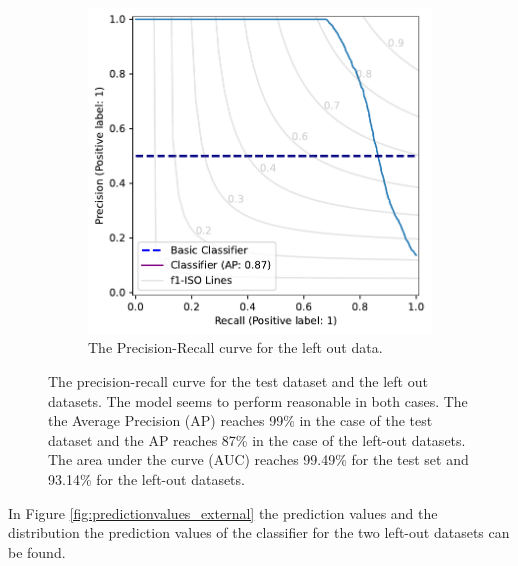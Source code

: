 \documentclass[a4paper, 12pt, oneside]{book} %
\begin{document}
\begin{figure} [htpb]
\begin{subfigure}[b]{0.49\textwidth}
         \includegraphics[width=\textwidth]{precision_recall_plot_extern.pdf}
         \caption{The Precision-Recall curve for the left out data.}
         \label{fig:precision_recall_curve_test_external}
     \end{subfigure}
     \caption[Precision recall curves for test and left-out datasets]{The precision-recall curve for the test dataset and the left out datasets. The model seems to perform reasonable in both cases. The the Average Precision (AP) reaches 99\% in the case of the test dataset and the AP reaches 87\% in the case of the left-out datasets. The area under the curve (AUC) reaches 99.49\% for the test set and 93.14\% for the left-out datasets.}
     \label{fig:precision-recall}
\end{figure}

In Figure \ref{fig:predictionvalues_external} the prediction values and the distribution the prediction values of the classifier for the two left-out datasets can be found.

\end{document}
